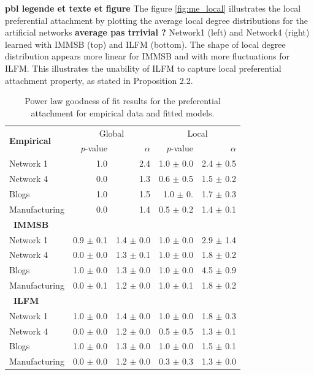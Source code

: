 \textbf{pbl legende et texte et figure}
The figure \ref{fig:me_local} illustrates the local preferential attachment by plotting the average local degree distributions for the artificial networks \textbf{average pas trrivial ?}  Network1 (left) and Network4 (right) learned with IMMSB (top) and ILFM (bottom). The shape of local degree distribution appears more linear for IMMSB and with more fluctuations for ILFM. This illustrates the unability  of ILFM to capture local preferential attachment property,  as stated in Proposition 2.2. 
 

\begin{table}[t]
    \caption{Power law goodness of fit results for the preferential attachment for empirical data and fitted models.}
\centering
  \begin{tabular}{lrrrr}
      \multirow{2}{*}{\textbf{Empirical}}  &
      \multicolumn{2}{c}{Global} & \multicolumn{2}{c}{Local}\\
      \cmidrule(r){2-3} \cmidrule(l){4-5}
      &   $p$-value &   $\alpha$   & $p$-value & $\alpha$   \\
  	\hline
    Network 1     &    1.0 &   2.4 & 1.0 $\pm$ 0.0  &  2.4 $\pm$ 0.5  \\
    Network 4     &    0.0 &   1.3 & 0.6 $\pm$ 0.5  &  1.5 $\pm$ 0.2 \\
    Blogs         &    1.0 &   1.5 & 1.0 $\pm$ 0.   &  1.7 $\pm$ 0.3 \\
    Manufacturing &    0.0 &   1.4 & 0.5 $\pm$ 0.2  &  1.4 $\pm$ 0.1 \\
  	\hline

      \ \textbf{IMMSB} &&&& \\
  	\hline
    Network 1     & 0.9 \(\pm\) 0.1   & 1.4 \(\pm\) 0.0 & 1.0 \(\pm\) 0.0   & 2.9 \(\pm\) 1.4 \\
    Network 4     & 0.0 \(\pm\) 0.0   & 1.3 \(\pm\) 0.1 & 1.0 \(\pm\) 0.0   & 1.8 \(\pm\) 0.2 \\
    Blogs         & 1.0 \(\pm\) 0.0   & 1.3 \(\pm\) 0.0 & 1.0 \(\pm\) 0.0   & 4.5 \(\pm\) 0.9 \\
    Manufacturing & 0.0 \(\pm\) 0.1   & 1.2 \(\pm\) 0.0 & 1.0 \(\pm\) 0.1   & 1.8 \(\pm\) 0.2 \\
  	\hline

      \ \textbf{ILFM} &&&& \\
  	\hline
    Network 1     & 1.0 \(\pm\) 0.0 & 1.4 \(\pm\) 0.0 & 1.0 \(\pm\) 0.0 & 1.8 \(\pm\) 0.3 \\
    Network 4     & 0.0 \(\pm\) 0.0 & 1.2 \(\pm\) 0.0 & 0.5 \(\pm\) 0.5 & 1.3 \(\pm\) 0.1 \\
    Blogs         & 1.0 \(\pm\) 0.0 & 1.3 \(\pm\) 0.0 & 1.0 \(\pm\) 0.0 & 1.5 \(\pm\) 0.1 \\
    Manufacturing & 0.0 \(\pm\) 0.0 & 1.2 \(\pm\) 0.0 & 0.3 \(\pm\) 0.3 & 1.3 \(\pm\) 0.0 \\
  	\hline
  \end{tabular}
\label{table:me_gofit}
\end{table}

